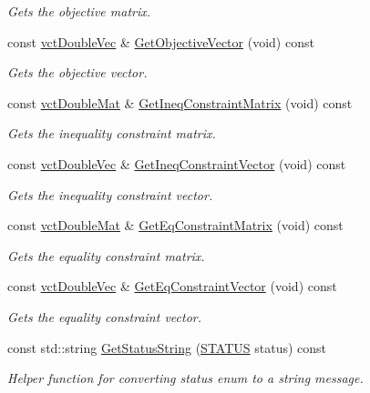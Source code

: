 \begin{DoxyCompactItemize}
\begin{DoxyCompactList}\small\item\em Gets the objective matrix. \end{DoxyCompactList}\item 
const \hyperlink{vct_dynamic_vector_types_8h_ade4b3068c86fb88f41af2e5187e491c2}{vct\+Double\+Vec} \& \hyperlink{classnmr_constraint_optimizer_a835ec60432eb686754959afa2e0dec35}{Get\+Objective\+Vector} (void) const 
\begin{DoxyCompactList}\small\item\em Gets the objective vector. \end{DoxyCompactList}\item 
const \hyperlink{vct_dynamic_matrix_types_8h_a48f1eb2461d20a99e824ee5753a37c84}{vct\+Double\+Mat} \& \hyperlink{classnmr_constraint_optimizer_a732e496cb26a4806c8c0d7d66d65a44f}{Get\+Ineq\+Constraint\+Matrix} (void) const 
\begin{DoxyCompactList}\small\item\em Gets the inequality constraint matrix. \end{DoxyCompactList}\item 
const \hyperlink{vct_dynamic_vector_types_8h_ade4b3068c86fb88f41af2e5187e491c2}{vct\+Double\+Vec} \& \hyperlink{classnmr_constraint_optimizer_a76b519ce61aa79cc2aa84dd4013650d4}{Get\+Ineq\+Constraint\+Vector} (void) const 
\begin{DoxyCompactList}\small\item\em Gets the inequality constraint vector. \end{DoxyCompactList}\item 
const \hyperlink{vct_dynamic_matrix_types_8h_a48f1eb2461d20a99e824ee5753a37c84}{vct\+Double\+Mat} \& \hyperlink{classnmr_constraint_optimizer_a4fbb9e87f37b097e35afbd9d456fe584}{Get\+Eq\+Constraint\+Matrix} (void) const 
\begin{DoxyCompactList}\small\item\em Gets the equality constraint matrix. \end{DoxyCompactList}\item 
const \hyperlink{vct_dynamic_vector_types_8h_ade4b3068c86fb88f41af2e5187e491c2}{vct\+Double\+Vec} \& \hyperlink{classnmr_constraint_optimizer_af6d4834401a9a12904b686660d636fc6}{Get\+Eq\+Constraint\+Vector} (void) const 
\begin{DoxyCompactList}\small\item\em Gets the equality constraint vector. \end{DoxyCompactList}\item 
const std\+::string \hyperlink{classnmr_constraint_optimizer_a99420d0d71c6f00da08ed2f2307b2afb}{Get\+Status\+String} (\hyperlink{classnmr_constraint_optimizer_ad46bf972892431d2c0a43a7099aec898}{S\+T\+A\+T\+U\+S} status) const 
\begin{DoxyCompactList}\small\item\em Helper function for converting status enum to a string message. \end{DoxyCompactList}\end{DoxyCompactItemize}



